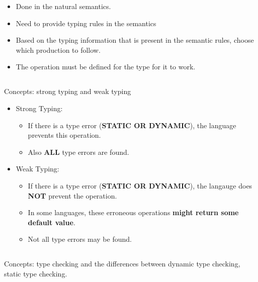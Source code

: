 \begin{itemize}[noitemsep]
\item Done in the natural semantics.
\item Need to provide typing rules in the semantics
\item Based on the typing information that is present in the semantic rules, choose which production to follow.
\item The operation must be defined for the type for it to work.
\end{itemize}

\subsection{}
Concepts: strong typing and weak typing

\begin{itemize}
\item Strong Typing:
  \begin{itemize}[noitemsep]
  \item If there is a type error (\textbf{STATIC OR DYNAMIC}), the language prevents this operation.
  \item Also \textbf{ALL} type errors are found.
  \end{itemize}

\item Weak Typing:
  \begin{itemize}[noitemsep]
  \item If there is a type error (\textbf{STATIC OR DYNAMIC}), the langauge does \textbf{NOT} prevent the operation.
  \item In some languages, these erroneous operations \textbf{might return some default value}.
  \item Not all type errors may be found.
  \end{itemize}
\end{itemize}

\subsection{}
Concepts: type checking and the differences between dynamic type checking, static type checking.

